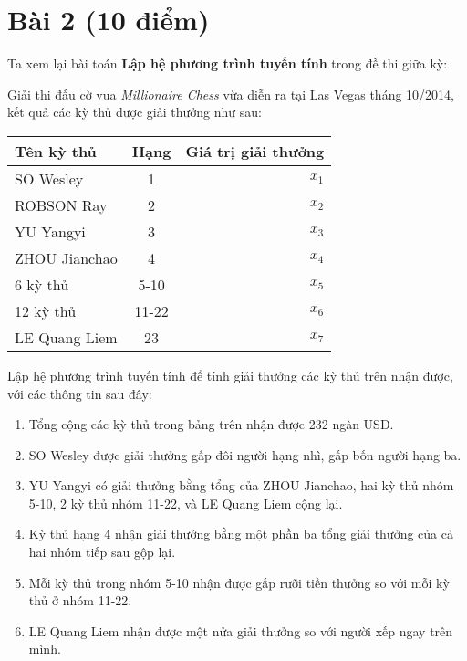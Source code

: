 \documentclass[12pt]{article}
\begin{document}
\section{Bài 2 (10 điểm)}

Ta xem lại bài toán \textbf{Lập hệ phương trình tuyến tính} trong đề thi giữa kỳ:

Giải thi đấu cờ vua \emph{Millionaire Chess} vừa diễn ra tại Las Vegas tháng 10/2014, kết quả các kỳ thủ được giải thưởng như sau:

\begin{center}
\begin{tabular}{l|c|r}
Tên kỳ thủ & Hạng & Giá trị giải thưởng \\
\hline
SO Wesley & 1 & $x_1$ \\%
ROBSON Ray & 2 & $x_2$ \\%
YU Yangyi & 3 & $x_3$ \\%
ZHOU Jianchao & 4 & $x_4$ \\%
6 kỳ thủ & 5-10 & $x_5$ \\%
12 kỳ thủ & 11-22 & $x_6$ \\%
LE Quang Liem & 23 & $x_7$ \\%
\end{tabular}
\end{center}

Lập hệ phương trình tuyến tính để tính giải thưởng các kỳ thủ trên nhận được, với các thông tin sau đây:
\begin{enumerate}
 \item Tổng cộng các kỳ thủ trong bảng trên nhận được 232 ngàn USD. %
 \item SO Wesley được giải thưởng gấp đôi người hạng nhì, gấp bốn người hạng ba. %
 \item YU Yangyi có giải thưởng bằng tổng của ZHOU Jianchao, hai kỳ thủ nhóm 5-10, 2 kỳ thủ nhóm 11-22, và LE Quang Liem cộng lại. %
 \item Kỳ thủ hạng 4 nhận giải thưởng bằng một phần ba tổng giải thưởng của cả hai nhóm tiếp sau gộp lại. %
 \item Mỗi kỳ thủ trong nhóm 5-10 nhận được gấp rưỡi tiền thưởng so với mỗi kỳ thủ ở nhóm 11-22. %
 \item LE Quang Liem nhận được một nửa giải thưởng so với người xếp ngay trên mình. %
\end{enumerate}
\end{document}
